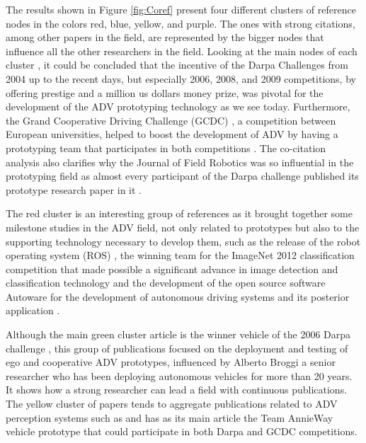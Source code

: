 \documentclass[lettersize,journal]{IEEEtran}
\begin{document}
The results shown in Figure \ref{fig:Coref} present four different clusters of reference nodes in the colors red, blue, yellow, and purple. The ones with strong citations, among other papers in the field, are represented by the bigger nodes that influence all the other researchers in the field. Looking at the main nodes of each cluster \cite{Urmson2008,Thrun2006,Buehler2009,Kammel2008}, it could be concluded that the incentive of the Darpa Challenges \cite{Darpa} from 2004 up to the recent days, but especially 2006, 2008, and 2009 competitions, by offering prestige and a million us dollars money prize, was pivotal for the development of the ADV prototyping technology as we see today. Furthermore, the Grand Cooperative Driving Challenge (GCDC) \cite{GCDC}, a competition between European universities, helped to boost the development of ADV by having a prototyping team that participates in both competitions \cite{Geiger2012}. The co-citation analysis also clarifies why the Journal of Field Robotics was so influential in the prototyping field as almost every participant of the Darpa challenge published its prototype research paper in it \cite{Leonard2008, Bacha2008,Montemerlo2008, Thrun2006,Kammel2008,Urmson2008,Urmson2009,Buehler2009}.

The red cluster is an interesting group of references as it brought together some milestone studies in the ADV field, not only related to prototypes but also to the supporting technology necessary to develop them, such as the release of the robot operating system (ROS) \cite{quigley2009}, the winning team for the ImageNet 2012 classification competition \cite{Krizhevsky2017} that made possible a significant advance in image detection and classification technology and the development of the open source software Autoware \cite{Kato2015} for the development of autonomous driving systems and its posterior application \cite{Kato2018}.

Although the main green cluster article is the winner vehicle of the 2006 Darpa challenge \cite{Thrun2006}, this group of publications focused on the deployment and testing of ego and cooperative ADV prototypes, influenced by Alberto Broggi \cite{Broggi1999, Broggi2013, Broggi2015, Broggi2015a} a senior researcher who has been deploying autonomous vehicles for more than 20 years. It shows how a strong researcher can lead a field with continuous publications. The yellow cluster of papers tends to aggregate publications related to ADV perception systems such as \cite{hirschmuller2005, dickmanns1990} and has as its main article the Team AnnieWay vehicle prototype \cite{Kammel2008} that could participate in both Darpa and GCDC competitions.
\end{document}
